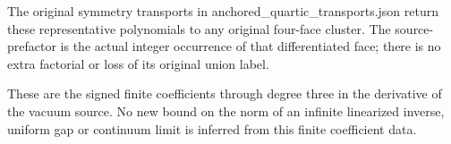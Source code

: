 \documentclass[11pt,a4paper]{article}
\renewcommand{\[}{\begingroup\small\originaldisplaystart}
\renewcommand{\]}{\originaldisplayend\endgroup}
\begin{document}
The original symmetry transports in
{\ttfamily a\allowbreak{}n\allowbreak{}c\allowbreak{}h\allowbreak{}o\allowbreak{}r\allowbreak{}e\allowbreak{}d\allowbreak{}\_\allowbreak{}q\allowbreak{}u\allowbreak{}a\allowbreak{}r\allowbreak{}t\allowbreak{}i\allowbreak{}c\allowbreak{}\_\allowbreak{}t\allowbreak{}r\allowbreak{}a\allowbreak{}n\allowbreak{}s\allowbreak{}p\allowbreak{}o\allowbreak{}r\allowbreak{}t\allowbreak{}s\allowbreak{}.\allowbreak{}j\allowbreak{}s\allowbreak{}o\allowbreak{}n\allowbreak{}}
return these representative polynomials to any original four-face
cluster. The source-prefactor is the actual integer occurrence of that
differentiated face; there is no extra factorial or loss of its original
union label.

These are the signed finite coefficients through degree three in the
derivative of the vacuum source. No new bound on the norm of an infinite
linearized inverse, uniform gap or continuum limit is inferred from this
finite coefficient data.
\end{document}
